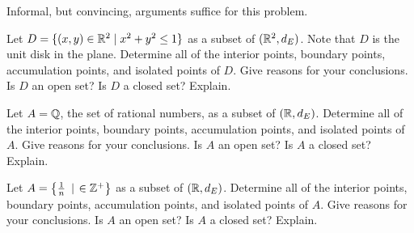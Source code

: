 
\be

\item Informal, but convincing, arguments suffice for this problem.

\ba  

\item Let $D = \{(x,y) \in \mathbb{R}^2 \mid x^2+y^2 \leq 1\}$ as a subset of $(\mathbb{R}^2,d_E)$. Note that $D$ is the unit disk in the plane. Determine all of the interior points, boundary points, accumulation points, and isolated points of $D$. Give reasons for your conclusions. Is $D$ an open set? Is $D$ a closed set? Explain.

\item Let $A = \mathbb{Q}$, the set of rational numbers, as a subset of $(\mathbb{R},d_E)$. Determine all of the interior points, boundary points, accumulation points, and isolated points of $A$. Give reasons for your conclusions. Is $A$ an open set? Is $A$ a closed set? Explain. 

\item Let $A = \left\{\frac{1}{n} \ \left| \right. \in \mathbb{Z}^+\right\}$ as a subset of $(\mathbb{R},d_E)$. Determine all of the interior points, boundary points, accumulation points, and isolated points of $A$. Give reasons for your conclusions. Is $A$ an open set? Is $A$ a closed set? Explain.


\ea

